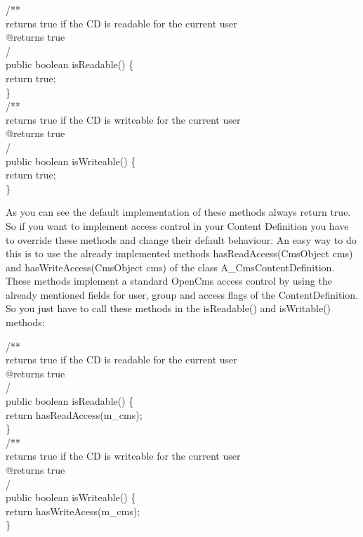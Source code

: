 \begin{java}
\jtaba          /**\\
\jtaba   \xspace * returns true if the CD is readable for the current user\\
\jtaba   \xspace * @returns true\\
\jtaba   \xspace */\\ 
\jtaba public boolean isReadable() \{\\
\jtabb    return true;\\
\jtaba \}\\[1ex]

\jtaba          /**\\
\jtaba   \xspace * returns true if the CD is writeable for the current user\\
\jtaba   \xspace * @returns true\\
\jtaba   \xspace */\\
\jtaba public boolean isWriteable() \{\\
\jtabb    return true;\\
\jtaba \}
\end{java}

As you can see the default implementation of these methods always return true.
So if you want to implement access control in your Content Definition you have
to override these methods and change their default behaviour. An easy way to do
this is to use the already implemented methods {\meth hasReadAccess(CmsObject cms)}
and {\meth hasWriteAccess(CmsObject cms)} of the class {\class A\_CmsContentDefinition}.
These methods implement a standard OpenCms access control by using the already mentioned
fields for user, group and access flags of the ContentDefinition. So you just have to call
these methods in the {\meth isReadable()} and {\meth isWritable()} methods:

\begin{java}
\jtaba      /**\\
\jtaba   \xspace * returns true if the CD is readable for the current user\\
\jtaba   \xspace * @returns true\\
\jtaba   \xspace */\\ 
\jtaba public boolean isReadable() \{\\
\jtabb    return hasReadAccess(m\_cms);\\
\jtaba \}\\[1ex]

\jtaba          /**\\
\jtaba   \xspace * returns true if the CD is writeable for the current user\\
\jtaba   \xspace * @returns true\\
\jtaba   \xspace */\\
\jtaba public boolean isWriteable() \{\\
\jtabb    return hasWriteAcess(m\_cms);\\
\jtaba \}
\end{java}

